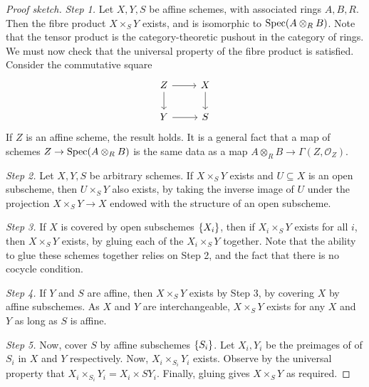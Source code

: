 \begin{proof}[Proof sketch]
    \emph{Step 1.}
    Let \( X, Y, S \) be affine schemes, with associated rings \( A, B, R \).
    Then the fibre product \( X \times_S Y \) exists, and is isomorphic to \( \operatorname{Spec} (A \otimes_R B) \).
    Note that the tensor product is the category-theoretic pushout in the category of rings.
    We must now check that the universal property of the fibre product is satisfied.
    Consider the commutative square
\[\begin{tikzcd}
	Z & X \\
	Y & S
	\arrow[from=1-1, to=1-2]
	\arrow[from=1-2, to=2-2]
	\arrow[from=1-1, to=2-1]
	\arrow[from=2-1, to=2-2]
\end{tikzcd}\]
    If \( Z \) is an affine scheme, the result holds.
    It is a general fact that a map of schemes \( Z \to \operatorname{Spec} (A \otimes_R B) \) is the same data as a map \( A \otimes_R B \to \Gamma(Z, \mathcal O_Z) \).

    \emph{Step 2.}
    Let \( X, Y, S \) be arbitrary schemes.
    If \( X \times_S Y \) exists and \( U \subseteq X \) is an open subscheme, then \( U \times_S Y \) also exists, by taking the inverse image of \( U \) under the projection \( X \times_S Y \to X \) endowed with the structure of an open subscheme.

    \emph{Step 3.}
    If \( X \) is covered by open subschemes \( \qty{X_i} \), then if \( X_i \times_S Y \) exists for all \( i \), then \( X \times_S Y \) exists, by gluing each of the \( X_i \times_S Y \) together.
    Note that the ability to glue these schemes together relies on Step 2, and the fact that there is no cocycle condition.

    \emph{Step 4.}
    If \( Y \) and \( S \) are affine, then \( X \times_S Y \) exists by Step 3, by covering \( X \) by affine subschemes.
    As \( X \) and \( Y \) are interchangeable, \( X \times_S Y \) exists for any \( X \) and \( Y \) as long as \( S \) is affine.

    \emph{Step 5.}
    Now, cover \( S \) by affine subschemes \( \qty{S_i} \).
    Let \( X_i, Y_i \) be the preimages of of \( S_i \) in \( X \) and \( Y \) respectively.
    Now, \( X_i \times_{S_i} Y_i \) exists.
    Observe by the universal property that \( X_i \times_{S_i} Y_i = X_i \times S Y_i \).
    Finally, gluing gives \( X \times_S Y \) as required. 
\end{proof}
